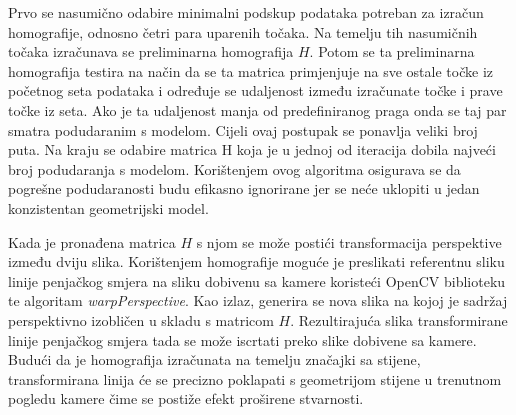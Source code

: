 Prvo se nasumično odabire minimalni podskup podataka potreban za izračun homografije, odnosno četri para uparenih točaka. Na temelju tih nasumičnih točaka izračunava se preliminarna homografija $H$. Potom se ta preliminarna homografija testira na način da se ta matrica primjenjuje na sve ostale točke iz početnog seta podataka i određuje se udaljenost između izračunate točke i prave točke iz seta. Ako je ta udaljenost manja od predefiniranog praga onda se taj par smatra podudaranim s modelom. Cijeli ovaj postupak se ponavlja veliki broj puta. 
Na kraju se odabire matrica H koja je u jednoj od iteracija dobila najveći broj podudaranja s modelom. Korištenjem ovog algoritma osigurava se da pogrešne podudaranosti budu efikasno ignorirane jer se neće uklopiti u jedan konzistentan geometrijski model.

Kada je pronađena matrica $H$ s njom se može postići transformacija perspektive između dviju slika. Korištenjem homografije moguće je preslikati referentnu sliku linije penjačkog smjera na sliku dobivenu sa kamere koristeći OpenCV biblioteku te algoritam \textit{warpPerspective}. Kao izlaz, generira se nova slika na kojoj je sadržaj perspektivno izobličen u skladu s matricom $H$. Rezultirajuća slika transformirane linije penjačkog smjera tada se može iscrtati preko slike dobivene sa kamere. Budući da je homografija izračunata na temelju značajki sa stijene, transformirana linija će se precizno poklapati s geometrijom stijene u trenutnom pogledu kamere čime se postiže efekt proširene stvarnosti.